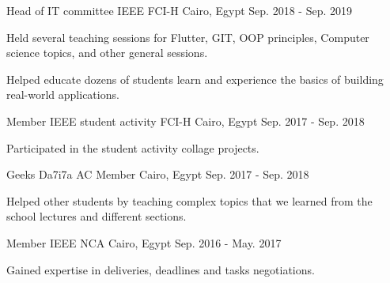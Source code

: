 

\begin{cventries}

  \cventry
    {Head of IT committee} %
    {IEEE FCI-H} %
    {Cairo, Egypt} %
    {Sep. 2018 - Sep. 2019} %
    {
      \begin{cvitems} %
        \item {Held several teaching sessions for Flutter, GIT, OOP principles, Computer science topics, and other general sessions.}
        \item {Helped educate dozens of students learn and experience the basics of building real-world applications.}
      \end{cvitems}
    }

  \cventry
    {Member} %
    {IEEE student activity FCI-H} %
    {Cairo, Egypt} %
    {Sep. 2017 - Sep. 2018} %
    {
      \begin{cvitems} %
        \item {Participated in the student activity collage projects.}
      \end{cvitems}
    }

  \cventry
    {Geeks Da7i7a} %
    {AC Member} %
    {Cairo, Egypt} %
    {Sep. 2017 - Sep. 2018} %
    {
      \begin{cvitems} %
        \item {Helped other students by teaching complex topics that we learned from the school lectures and different sections.}
      \end{cvitems}
    }

  \cventry
    {Member} %
    {IEEE NCA} %
    {Cairo, Egypt} %
    {Sep. 2016 - May. 2017} %
    {
      \begin{cvitems} %
        \item {Gained expertise in deliveries, deadlines and tasks negotiations.}
      \end{cvitems}
    }

\end{cventries}
